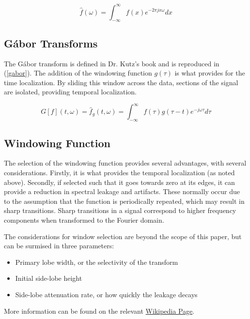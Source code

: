 \documentclass[journal]{IEEEtran}
\begin{document}
\begin{equation}
\label{fourier}
\hat{f}(\omega)=\int_{-\infty}^{\infty}f(x)e^{-2 \pi jx \omega}dx
\end{equation}

\subsection{G\'{a}bor Transforms}
The G\'{a}bor transform is defined in Dr. Kutz's book and is reproduced in (\ref{gabor}). The addition of the windowing function $g(\tau)$ is what provides for the time localization. By sliding this window across
the data, sections of the signal are isolated, providing temporal localization.

\begin{equation}
\label{gabor}
G[f](t,\omega)=\hat{f}_{g}(t,\omega)=\int_{-\infty}^{\infty}f(\tau)g(\tau-t)e^{-j\omega\tau}d\tau
\end{equation}


\subsection{Windowing Function}
The selection of the windowing function provides several advantages, with several considerations. Firstly, it is what provides the temporal localization (as noted above). Secondly, if selected such that it goes towards
zero at its edges, it can provide a reduction in spectral leakage and artifacts. These normally occur due to the assumption that the function is periodically repeated, which may result in sharp transitions. Sharp transitions
in a signal correspond to higher frequency components when transformed to the Fourier domain.

The considerations for window selection are beyond the scope of this paper, but can be surmised in three parameters:
\begin{itemize}
	\item Primary lobe width, or the selectivity of the transform
	\item Initial side-lobe height
	\item Side-lobe attenuation rate, or how quickly the leakage decays
\end{itemize}

More information can be found on the relevant \href{https://en.wikipedia.org/wiki/Window_function}{Wikipedia Page}.
\end{document}
